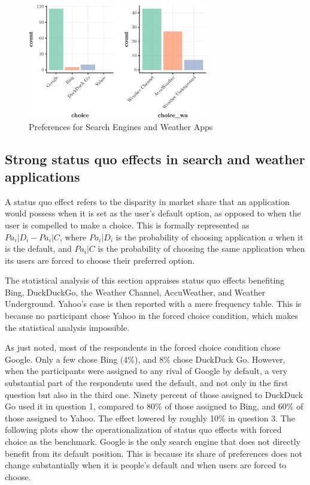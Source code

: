 \documentclass[
  11pt,
]{article}
\begin{document}
\begin{figure}

{\centering \includegraphics[width=0.7\textwidth]{Results-July19-307_files/figure-latex/preferences-1} 

}

\caption{Preferences for Search Engines and Weather Apps}\label{fig:preferences}
\end{figure}

\hypertarget{strong-status-quo-effects-in-search-and-weather-applications}{%
\subsection{Strong status quo effects in search and weather applications}\label{strong-status-quo-effects-in-search-and-weather-applications}}

A status quo effect refers to the disparity in market share that an application would possess when it is set as the user's default option, as opposed to when the user is compelled to make a choice. This is formally represented as \(Pa_i|D_i - Pa_i|C\), where \(Pa_i|D_i\) is the probability of choosing application \(a\) when it is the default, and \(Pa_i|C\) is the probability of choosing the same application when its users are forced to choose their preferred option.

The statistical analysis of this section appraises status quo effects benefiting Bing, DuckDuckGo, the Weather Channel, AccuWeather, and Weather Underground. Yahoo's case is then reported with a mere frequency table. This is because no participant chose Yahoo in the forced choice condition, which makes the statistical analysis impossible.

As just noted, most of the respondents in the forced choice condition chose Google. Only a few chose Bing (4\%), and 8\% chose DuckDuck Go. However, when the participants were assigned to any rival of Google by default, a very substantial part of the respondents used the default, and not only in the first question but also in the third one. Ninety percent of those assigned to DuckDuck Go used it in question 1, compared to 80\% of those assigned to Bing, and 60\% of those assigned to Yahoo. The effect lowered by roughly 10\% in question 3. The following plots show the operationalization of status quo effects with forced choice as the benchmark. Google is the only search engine that does not directly benefit from its default position. This is because its share of preferences does not change substantially when it is people's default and when users are forced to choose.
\end{document}
